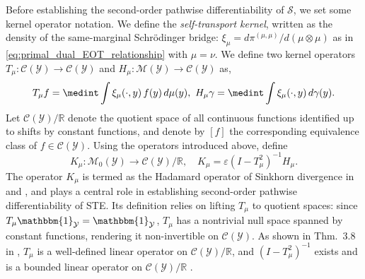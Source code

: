 \documentclass{article}
\theoremstyle{plain}
\theoremstyle{definition}
\theoremstyle{remark}
\newcommand{\R}{\mathbb{R}}
\newcommand{\cC}{\mathcal{C}}
\newcommand{\cM}{\mathcal{M}}
\newcommand{\cY}{\mathcal{Y}}
\newcommand{\1}{\mathbbm{1}}
\newcommand{\STE}{\mathscr{S}}
\newcommand{\eps}{\varepsilon}
\theoremstyle{plain}
\theoremstyle{definition}
\begin{document}
Before establishing the second-order pathwise differentiability of $\STE$, we set some kernel operator notation. We define the \textit{self-transport kernel}, written as the density of the same-marginal Schrödinger bridge: $\xi_{\mu} = d\pi^{(\mu, \mu)} / d(\mu \otimes \mu)$ as in \eqref{eq:primal_dual_EOT_relationship} with $\mu=\nu$.
We define two kernel operators $T_\mu: \cC(\cY) \to \cC(\cY)$ and $H_\mu: \cM(\cY) \to \cC(\cY)$ as,
\begin{align}\label{eq:TH_operators}
    T_\mu f = \medint\int \xi_\mu(\cdot, y) \, f(y) \, d\mu(y), \, \,
    H_\mu \gamma = \medint\int \xi_\mu(\cdot, y) \, d\gamma(y).
\end{align}
Let $\cC(\cY) / \R$ denote the quotient space of all continuous functions identified up to shifts by constant functions, and denote by $[f]$ the corresponding equivalence class of $f \in \cC(\cY)$. Using the operators introduced above, define 
\[
K_\mu: \cM_0(\cY) \to \cC(\cY) / \R, \quad K_\mu = \eps (I - T_\mu^2)^{-1} H_\mu.
\]
The operator $K_\mu$ is termed as the Hadamard operator of Sinkhorn divergence in \citet{kokot2025coreset} and \citet{gonzalez2022weak}, and plays a central role in establishing second-order pathwise differentiability of STE. Its definition relies on lifting $T_\mu$ to quotient spaces: since $T_\mu \1_\cY = \1_\cY$, $T_\mu$ has a nontrivial null space spanned by constant functions, rendering it non-invertible on $\cC(\cY)$. As shown in Thm.~3.8 in \citet{lavenant2024riemannian}, $T_\mu$ is a well-defined linear operator on $\cC(\cY) / \R$, and $(I - T_\mu^2)^{-1}$ exists and is a bounded linear operator on $\cC(\cY) / \R$ \citep[see Section 3 of][]{lavenant2024riemannian}. 
\end{document}
